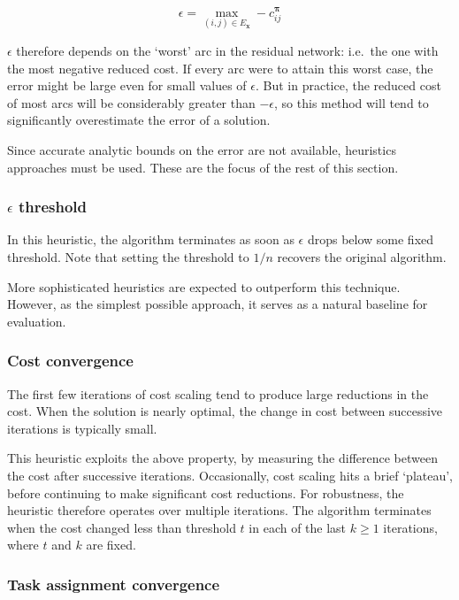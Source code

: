 \[\epsilon = \max_{(i,j) \in E_\mathbf{x}} -c_{ij}^{\boldsymbol{\pi}}\]

$\epsilon$ therefore depends on the `worst' arc in the residual network: i.e.\ the one with the most negative reduced cost. If every arc were to attain this worst case, the error might be large even for small values of $\epsilon$. But in practice, the reduced cost of most arcs will be considerably greater than $-\epsilon$, so this method will tend to significantly overestimate the error of a solution.

Since accurate analytic bounds on the error are not available, heuristics approaches must be used. These are the focus of the rest of this section.

\subsubsection{$\epsilon$ threshold}

In this heuristic, the algorithm terminates as soon as $\epsilon$ drops below some fixed threshold. Note that setting the threshold to $1/n$ recovers the original algorithm.

More sophisticated heuristics are expected to outperform this technique. However, as the simplest possible approach, it serves as a natural baseline for evaluation.

\subsubsection{Cost convergence}

The first few iterations of cost scaling tend to produce large reductions in the cost. When the solution is nearly optimal, the change in cost between successive iterations is typically small.

This heuristic exploits the above property, by measuring the difference between the cost after successive iterations. Occasionally, cost scaling hits a brief `plateau', before continuing to make significant cost reductions. For robustness, the heuristic therefore operates over multiple iterations. The algorithm terminates when the cost changed less than threshold $t$ in each of the last $k \geq 1$ iterations, where $t$ and $k$ are fixed.

\subsubsection{Task assignment convergence}

